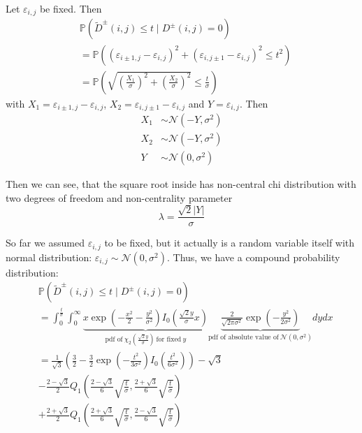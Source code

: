 \documentclass{beamer}
\newcommand{\abs}[1]{\lvert#1\rvert}
\begin{document}
\begin{frame}
	Let $\varepsilon_{i, j}$ be fixed. Then
	\begin{align*}
		&\mathbb{P}(\tilde{D}^\pm(i, j) \leq t \mid D^\pm(i, j) = 0) \\
		&= \mathbb{P}\left( (\varepsilon_{i \pm 1, j} - \varepsilon_{i, j})^2 + (\varepsilon_{i, j \pm 1} - \varepsilon_{i, j})^2 \leq t^2 \right) \\
		&= \mathbb{P}\left( \sqrt{\left( \frac{X_1}{\sigma} \right)^2 + \left( \frac{X_2}{\sigma} \right)^2} \leq \frac{t}{\sigma} \right)
	\end{align*}
	with $X_1 = \varepsilon_{i \pm 1, j} - \varepsilon_{i, j}$, $X_2 = \varepsilon_{i, j \pm 1} - \varepsilon_{i, j}$ and $Y = \varepsilon_{i, j}$. Then
	\begin{align*}
		X_1 &\sim \mathcal{N}(- Y, \sigma^2) \\
		X_2 &\sim \mathcal{N}(- Y, \sigma^2) \\
		Y &\sim \mathcal{N}(0, \sigma^2)
	\end{align*}
	
	Then we can see, that the square root inside has non-central chi distribution with two degrees of freedom and non-centrality parameter
	\begin{equation*}
		\lambda = \frac{\sqrt{2} \abs{Y}}{\sigma}
	\end{equation*}
\end{frame}

\begin{frame}
	So far we assumed $\varepsilon_{i, j}$ to be fixed, but it actually is a random variable itself with normal distribution: $\varepsilon_{i, j} \sim \mathcal{N}(0, \sigma^2)$. Thus, we have a compound probability distribution:
	\begin{align*}
		&\mathbb{P}(\tilde{D}^\pm(i, j) \leq t \mid D^\pm(i, j) = 0) \\
		&= \int_0^\frac{t}{\sigma} \int_0^\infty \underbrace{x \exp \left( - \frac{x^2}{2} - \frac{y^2}{\sigma^2} \right) I_0 \left( \frac{\sqrt{2} y}{\sigma} x \right)}_{\textrm{pdf of} \ \chi_2 \left( \frac{\sqrt{2} y}{\sigma} \right) \ \textrm{for fixed} \ y} \underbrace{\frac{2}{\sqrt{2 \pi \sigma^2}} \exp \left( - \frac{y^2}{2 \sigma^2} \right)}_{\textrm{pdf of absolute value of} \ \mathcal{N}(0, \sigma^2)} dy dx \\
		&= \frac{1}{\sqrt{3}} \left( \frac{3}{2} - \frac{3}{2} \exp \left( - \frac{t^2}{3 \sigma^2} \right) I_0 \left( \frac{t^2}{6 \sigma^2} \right) \right) - \sqrt{3} \\
		&- \frac{2 - \sqrt{3}}{2} Q_1 \left( \frac{2 - \sqrt{3}}{6} \sqrt{\frac{t}{\sigma}}, \frac{2 + \sqrt{3}}{6} \sqrt{\frac{t}{\sigma}} \right) \\
		&+ \frac{2 + \sqrt{3}}{2} Q_1 \left( \frac{2 + \sqrt{3}}{6} \sqrt{\frac{t}{\sigma}}, \frac{2 - \sqrt{3}}{6} \sqrt{\frac{t}{\sigma}} \right)
	\end{align*}
\end{frame}
\end{document}
